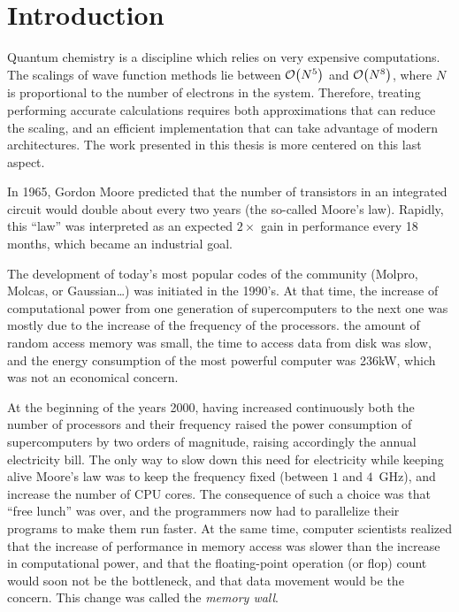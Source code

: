 \documentclass[12pt,a4paper]{report}
\begin{document}



\chapter{Introduction}


Quantum chemistry is a discipline which relies on very expensive computations.
The scalings of wave function methods lie between $\order{N^5}$ and
$\order{N^8}$, where $N$ is proportional to the number of electrons in the
system. Therefore, treating performing accurate calculations requires both
approximations that can reduce the scaling, and an efficient implementation
that can take advantage of modern architectures. The work presented in this
thesis is more centered on this last aspect. 

In 1965, Gordon Moore predicted that the number of transistors in an integrated
circuit would double about every two years (the so-called Moore's
law).\cite{Moore}  Rapidly, this ``law'' was interpreted as an expected
$2\times$ gain in performance every 18 months, which became an industrial goal.

The development of today's most popular codes of the community
(Molpro\cite{Molpro}, Molcas\cite{Molcas}, or Gaussian\cite{g09}\dots) was
initiated in the 1990's.  At that time, the increase of computational power
from one generation of supercomputers to the next one was mostly due to the
increase of the frequency of the processors. the amount of random access memory
was small, the time to access data from disk was slow, and the energy
consumption of the most powerful computer was 236kW, which was not an
economical concern.\cite{top500_93}

At the beginning of the years 2000, having increased continuously both the number
of processors and their frequency raised the power consumption of
supercomputers by two orders of magnitude, raising accordingly the annual
electricity bill.  The only way to slow down this need for electricity while
keeping alive Moore's law was to keep the frequency fixed (between $1$ and
$4$~GHz), and increase the number of CPU cores.  The consequence of such a
choice was that ``free lunch'' was over, and the programmers now had to parallelize
their programs to make them run faster.\cite{Sutter_2005}
At the same time, computer scientists
realized that the increase of performance in memory access was slower than the
increase in computational power,\cite{Wulf1995Mar} and that the floating-point
operation (or flop) count would soon not be the bottleneck, and that data
movement would be the concern. This change was called the \emph{memory wall}.
\end{document}
